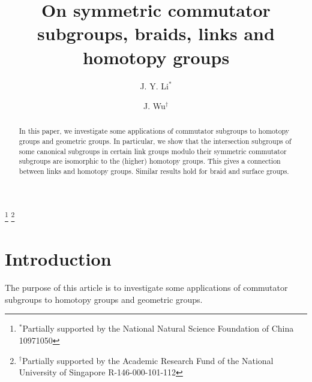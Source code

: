 \documentclass[10pt]{amsart}
\numberwithin{equation}{section}
\begin{document}
\author{J. Y. Li$^*$}
\address{ Institute of Mathematics and Physics, Shijiazhuang Railway Institute, Shijiazhuang 050043, China}
\author{J. Wu$^{\dag}$}
\address{Department of Mathematics\\
National University of Singapore\\
Block S17 (SOC1)\\
10, Lower Kent Ridge Road\\
Republic of Singapore}

\thanks{$^*$Partially supported by the National Natural Science Foundation of China 10971050}
\thanks{$^\dag$Partially supported by the Academic Research Fund
of the National University of Singapore R-146-000-101-112}



\begin{abstract}
In this paper, we investigate some applications of commutator
subgroups to homotopy groups and geometric groups. In particular, we
show that the intersection subgroups of some canonical subgroups in
certain link groups modulo their symmetric commutator subgroups are
isomorphic to the (higher) homotopy groups. This gives a connection
between links and homotopy groups. Similar results hold for braid
and surface groups.
\end{abstract}

\title[On symmetric commutator subgroups and homotopy groups]{On symmetric commutator subgroups, braids, links and homotopy groups}

\maketitle

\section{Introduction}

The purpose of this article is to investigate some applications of
commutator subgroups to homotopy groups and geometric groups.
\end{document}
